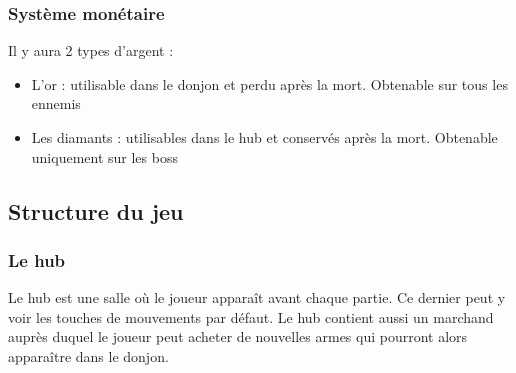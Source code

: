 \documentclass[]{extarticle}
\begin{document}
		\subsubsection{Système monétaire}
\bigbreak
\bigbreak
Il y aura 2 types d’argent :
\begin{itemize}
\item L’or : utilisable dans le donjon et perdu après la mort. Obtenable sur tous les ennemis
\item Les diamants : utilisables dans le hub et conservés après la mort. Obtenable uniquement sur les boss
\end{itemize}
\bigbreak
\newpage
	\subsection{Structure du jeu}
		\subsubsection{Le hub}
\bigbreak
\bigbreak
Le hub est une salle où le joueur apparaît avant chaque partie. Ce dernier peut y voir les touches de mouvements par défaut. Le hub contient aussi un marchand auprès duquel le joueur peut acheter de nouvelles armes qui pourront alors apparaître dans le donjon.
\bigbreak
\end{document}
